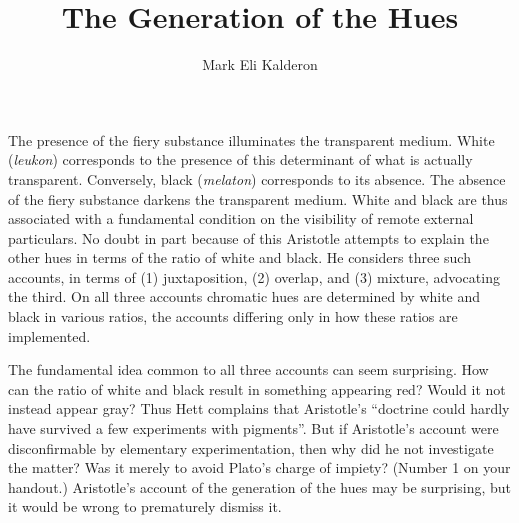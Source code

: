 %
%
%

\newcommand{\change}{\textcolor{blue}{\textbf{CHANGE SLIDE}}}
\newcommand\myauthor{Mark Eli Kalderon} 
\newcommand\mytitle{The Generation of the Hues}
\newcommand\myinstitution{University College London}


\usepackage{pgf}
\usepackage{tikz}
\usepackage{hyperref}



\title{\mytitle}

\author{\myauthor}
\institute{\myinstitution}

\date{}



\frame{\maketitle}

The presence of the fiery substance illuminates the transparent me\-di\-um. White (\emph{leukon}) corresponds to the presence of this determinant of what is actually transparent. Conversely, black (\emph{melaton}) corresponds to its absence. The absence of the fiery substance darkens the transparent medium. White and black are thus associated with a fundamental condition on the visibility of remote external particulars. No doubt in part because of this Aristotle attempts to explain the other hues in terms of the ratio of white and black. He considers three such accounts, in terms of (1) juxtaposition, (2) overlap, and (3) mixture, advocating the third. On all three accounts chromatic hues are determined by white and black in various ratios, the accounts differing only in how these ratios are implemented. 

The fundamental idea common to all three accounts can seem surprising. How can the ratio of white and black result in something appearing red? Would it not instead appear gray? Thus Hett complains that Aristotle's ``doctrine could hardly have survived a few experiments with pigments''. But if Aristotle's account were disconfirmable by elementary experimentation, then why did he not investigate the matter? Was it merely to avoid Plato's charge of impiety? (Number 1 on your handout.) Aristotle's account of the generation of the hues may be surprising, but it would be wrong to prematurely dismiss it. 

